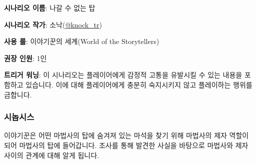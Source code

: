 \documentclass{report}
\begin{document}
	\textbf{시나리오 이름}: 나갈 수 없는 탑
	
	\textbf{시나리오 작가}: 소낙(\href{https://twitter.com/knock_tr}{@knock\_tr})
	
	\textbf{사용 룰}: 이야기꾼의 세계(World of the Storytellers)
	
	\textbf{권장 인원}: 1인
	
	\textbf{트리거 워닝}: 이 시나리오는 플레이어에게 감정적 고통을 유발시킬 수 있는 내용을 포함하고 있습니다. 이에 대해 플레이어에게 충분히 숙지시키지 않고 플레이하는 행위를 금합니다.
	
	\subsubsection*{시놉시스}
	
	이야기꾼은 어떤 마법사의 탑에 숨겨져 있는 마석을 찾기 위해 마법사의 제자 역할이 되어 마법사의 탑에 들어갑니다. 조사를 통해 발견한 사실을 바탕으로 마법사와 제자 사이의 관계에 대해 알게 됩니다.
\end{document}
